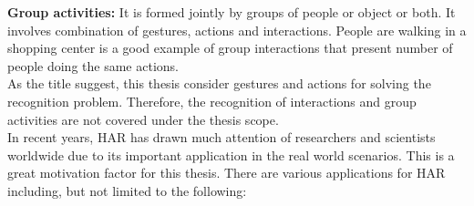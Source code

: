 \textbf{Group activities:} It is formed jointly by groups of people or object or both. It involves combination of gestures, actions and interactions. People are walking in a shopping center is a good example of group interactions that present number of people doing the same actions.\\

As the title suggest, this thesis consider gestures and actions for solving the recognition problem. Therefore, the recognition of interactions and group activities are not covered under the thesis scope.\\

In recent years, HAR has drawn much attention of researchers and scientists worldwide due to its important application in the real world scenarios. This is a great motivation factor for this thesis. There are various applications for HAR including, but not limited to the following:\\
